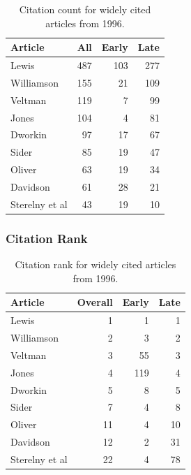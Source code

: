 \documentclass[
  10pt,
  letterpaper,
  DIV=11,
  numbers=noendperiod,
  twoside]{scrartcl}
\begin{document}
\begin{longtable}[]{@{}lrrr@{}}

\caption{\label{tbl-citation-count-1996}Citation count for widely cited
articles from 1996.}

\tabularnewline

\toprule\noalign{}
Article & All & Early & Late \\
\midrule\noalign{}
\endhead
\bottomrule\noalign{}
\endlastfoot
Lewis & 487 & 103 & 277 \\
Williamson & 155 & 21 & 109 \\
Veltman & 119 & 7 & 99 \\
Jones & 104 & 4 & 81 \\
Dworkin & 97 & 17 & 67 \\
Sider & 85 & 19 & 47 \\
Oliver & 63 & 19 & 34 \\
Davidson & 61 & 28 & 21 \\
Sterelny et al & 43 & 19 & 10 \\

\end{longtable}

\subsubsection*{Citation Rank}\label{sec-rank-1996}

\begin{longtable}[]{@{}lrrr@{}}

\caption{\label{tbl-citation-rank-1996}Citation rank for widely cited
articles from 1996.}

\tabularnewline

\toprule\noalign{}
Article & Overall & Early & Late \\
\midrule\noalign{}
\endhead
\bottomrule\noalign{}
\endlastfoot
Lewis & 1 & 1 & 1 \\
Williamson & 2 & 3 & 2 \\
Veltman & 3 & 55 & 3 \\
Jones & 4 & 119 & 4 \\
Dworkin & 5 & 8 & 5 \\
Sider & 7 & 4 & 8 \\
Oliver & 11 & 4 & 10 \\
Davidson & 12 & 2 & 31 \\
Sterelny et al & 22 & 4 & 78 \\

\end{longtable}
\end{document}
